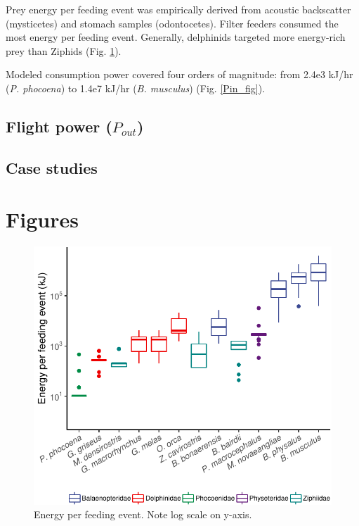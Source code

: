 \documentclass[]{elsarticle} %
\makeatletter
\def\maxwidth{\ifdim\Gin@nat@width>\linewidth\linewidth
\else\Gin@nat@width\fi}
\let\Oldincludegraphics\includegraphics
\renewcommand{\includegraphics}[1]{\Oldincludegraphics[width=\maxwidth]{#1}}
\makeatother
\begin{document}
Prey energy per feeding event was empirically derived from acoustic
backscatter (mysticetes) and stomach samples (odontocetes). Filter
feeders consumed the most energy per feeding event. Generally,
delphinids targeted more energy-rich prey than Ziphids (Fig.
\ref{Ep_fig}).

Modeled consumption power covered four orders of magnitude: from 2.4e3
kJ/hr (\emph{P. phocoena}) to 1.4e7 kJ/hr (\emph{B. musculus}) (Fig.
\ref{Pin_fig}).

\subsection{\texorpdfstring{Flight power
(\(P_{out}\))}{Flight power (P\_\{out\})}}\label{flight-power-p_out-1}

\subsection{Case studies}\label{case-studies-1}

\section{Figures}\label{figures}

\begin{figure}
\centering
\includegraphics{Sonar_Response_Manuscript_files/figure-latex/unnamed-chunk-2-1.pdf}
\caption{Energy per feeding event. Note log scale on y-axis.
\label{Ep_fig}}
\end{figure}
\end{document}

